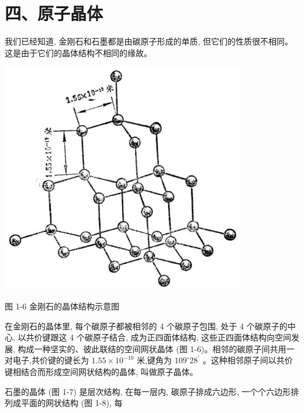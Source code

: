 \documentclass[10pt]{article}
\begin{document}
\section*{四、原子晶体}

我们已经知道, 金刚石和石墨都是由碳原子形成的单质, 但它们的性质很不相同。这是由于它们的晶体结构不相同的缘故。

\begin{center}
\includegraphics[max width=0.8\textwidth]{images/01912d13-9986-7822-a012-3f3f7be99dcb_18_466715.jpg}
\end{center}

图 1-6 金刚石的晶体结构示意图

在金刚石的晶体里, 每个碳原子都被相邻的 4 个碳原子包围, 处于 4 个碳原子的中心, 以共价键跟这 4 个碳原子结合, 成为正四面体结构, 这些正四面体结构向空间发展, 构成一种坚实的、彼此联结的空间网状晶体 (图 1-6)。相邻的碳原子间共用一对电子,共价键的键长为 \({1.55} \times {10}^{-{10}}\) 米,键角为 \({109}^{ \circ }{28}^{\prime }\) 。这种相邻原子间以共价键相结合而形成空间网状结构的晶体, 叫做原子晶体。

石墨的晶体 (图 1-7) 是层次结构, 在每一层内, 碳原子排成六边形, 一个个六边形排列成平面的网状结构 (图 1-8), 每
\end{document}
